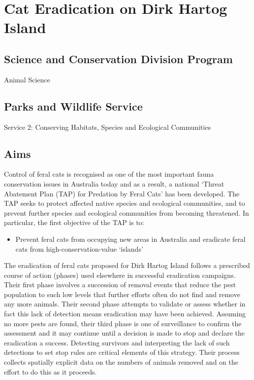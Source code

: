 \documentclass[version=last,
    paper=a4,                               %
    10pt,                                   %
    dvipsnames,
    oneside,                              %
    headings=openany,                       %
    open=any,
    BCOR=7mm,                               %
    DIV=15,     %
]{scrbook}
\begin{document}
\section*{Cat Eradication on Dirk Hartog Island
}



\subsection*{Science and Conservation Division Program}

Animal Science




\subsection*{Parks and Wildlife Service}

Service 2: Conserving Habitats, Species and Ecological Communities




\subsection*{Aims}

Control of feral cats is recognised as one of the most important fauna
conservation issues in Australia today and as a result, a national
`Threat Abatement Plan (TAP) for Predation by Feral Cats' has been
developed. The TAP seeks to protect affected native species and
ecological communities, and to prevent further species and ecological
communities from becoming threatened. In particular, the first objective
of the TAP is to:~

\begin{itemize}
\itemsep1pt\parskip0pt
\item
  Prevent feral cats from occupying new areas in Australia and eradicate
  feral cats from high-conservation-value `islands'
\end{itemize}

The eradication of feral cats proposed for Dirk Hartog Island follows a
prescribed course of action (phases) used elsewhere in successful
eradication campaigns. Their first phase involves a succession of
removal events that reduce the pest population to such low levels that
further efforts often do not find and remove any more animals. Their
second phase attempts to validate or assess whether in fact this lack of
detection means eradication may have been achieved. Assuming no more
pests are found, their third phase is one of surveillance to confirm the
assessment and it may continue until a decision is made to stop and
declare the eradication a success. Detecting survivors and interpreting
the lack of such detections to set stop rules are critical elements of
this strategy. Their process collects spatially explicit data on the
numbers of animals removed and on the effort to do this as it proceeds.
\end{document}
